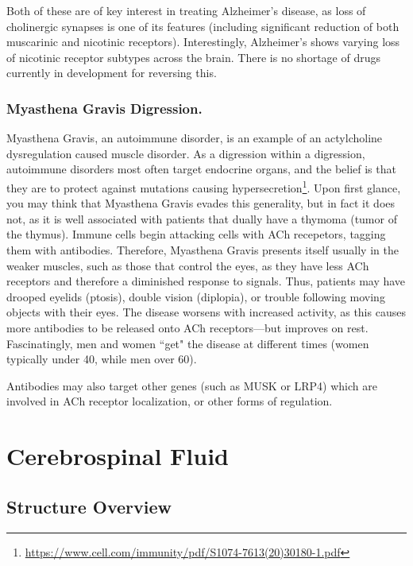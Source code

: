 Both of these are of key interest in treating Alzheimer's disease, as loss of cholinergic synapses is one of its features (including significant reduction of both muscarinic and nicotinic receptors). Interestingly, Alzheimer's shows varying loss of nicotinic receptor subtypes across the brain. There is no shortage of drugs currently in development for reversing this.\newline

\subsubsection{Myasthena Gravis Digression.}
Myasthena Gravis, an autoimmune disorder, is an example of an actylcholine dysregulation caused muscle disorder. As a digression within a digression, autoimmune disorders most often target endocrine organs, and the belief is that they are to protect against mutations causing hypersecretion\footnote{\url{https://www.cell.com/immunity/pdf/S1074-7613(20)30180-1.pdf}}. Upon first glance, you may think that Myasthena Gravis evades this generality, but in fact it does not, as it is well associated with patients that dually have a thymoma (tumor of the thymus). Immune cells begin attacking cells with ACh recepetors, tagging them with antibodies. Therefore, Myasthena Gravis presents itself usually in the weaker muscles, such as those that control the eyes, as they have less ACh receptors and therefore a diminished response to signals. Thus, patients may have drooped eyelids (ptosis), double vision (diplopia), or trouble following moving objects with their eyes. The disease worsens with increased activity, as this causes more antibodies to be released onto ACh receptors---but improves on rest. Fascinatingly, men and women ``get" the disease at different times (women typically under 40, while men over 60).\newline

Antibodies may also target other genes (such as MUSK or LRP4) which are involved in ACh receptor localization, or other forms of regulation.


\section{Cerebrospinal Fluid}

\subsection{Structure Overview}

